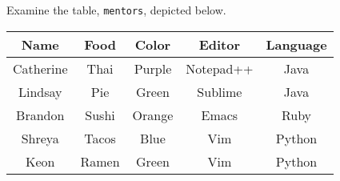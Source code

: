 Examine the table, \texttt{mentors}, depicted below.

\begin{center}
\begin{tabular}{|c|c|c|c|c|}
 \hline
 \textbf{Name} & \textbf{Food} & \textbf{Color} & \textbf{Editor} & \textbf{Language} \\
 \hline
 Catherine & Thai & Purple & Notepad++ & Java \\
 \hline
 Lindsay & Pie & Green & Sublime & Java \\
 \hline
 Brandon & Sushi & Orange & Emacs & Ruby \\
 \hline
 Shreya & Tacos & Blue & Vim & Python \\
 \hline
 Keon & Ramen & Green & Vim & Python \\
 \hline
\end{tabular}
\end{center}
